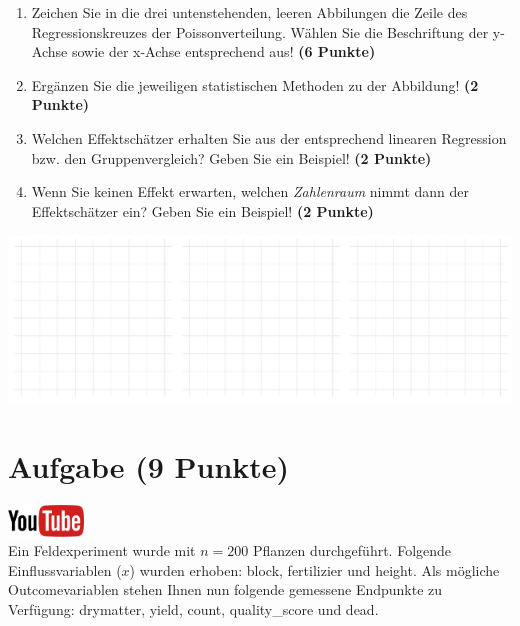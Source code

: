 \documentclass[a4paper, 9pt]{scrartcl}\usepackage[]{graphicx}\usepackage[]{xcolor}
\makeatletter
\def\maxwidth{ %
  \ifdim\Gin@nat@width>\linewidth
    \linewidth
  \else
    \Gin@nat@width
  \fi
}
\makeatother
\begin{document}
\begin{enumerate}
\item Zeichen Sie in die drei untenstehenden, leeren Abbilungen die Zeile des
  Regressionskreuzes der Poissonverteilung. W{\"a}hlen Sie die Beschriftung der
  y-Achse sowie der x-Achse entsprechend aus! \textbf{(6 Punkte)}
\item Erg{\"a}nzen Sie die jeweiligen statistischen Methoden zu der Abbildung! \textbf{(2 Punkte)}
\item Welchen Effektsch{\"a}tzer erhalten Sie aus der entsprechend linearen
  Regression bzw. den Gruppenvergleich? Geben Sie ein Beispiel! \textbf{(2 Punkte)}
\item Wenn Sie keinen Effekt erwarten, welchen \textit{Zahlenraum} nimmt dann
  der Effektsch{\"a}tzer ein? Geben Sie ein Beispiel! \textbf{(2 Punkte)}
\end{enumerate}



{\centering \includegraphics[width=\maxwidth]{img/regression-01-1} 

}



 
\clearpage

\section{Aufgabe \hfill (9 Punkte)}

\hfill\href{https://youtu.be/AwQEcQWLFCw}{\includegraphics[width =
  2cm]{img/youtube}}\\[1Ex]



Ein Feldexperiment wurde mit $n = 200$ Pflanzen durchgef{\"u}hrt. Folgende
Einflussvariablen ($x$) wurden erhoben: block, fertilizier und height. Als m{\"o}gliche Outcomevariablen stehen Ihnen nun
folgende gemessene Endpunkte zu Verf{\"u}gung: drymatter, yield, count, quality\_score und dead.
\end{document}

